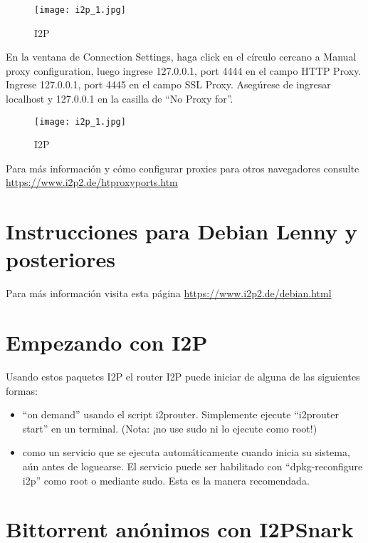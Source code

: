 \documentclass[10pt,a5paper,twoside,,]{book}
\providecommand{\tightlist}{%
  \setlength{\itemsep}{0pt}\setlength{\parskip}{0pt}}
\begin{document}
\begin{figure}[htbp]
\centering
\texttt{[image: i2p\_1.jpg]}
\caption{I2P}
\end{figure}

En la ventana de Connection Settings, haga click en el círculo cercano a
Manual proxy configuration, luego ingrese 127.0.0.1, port 4444 en el
campo HTTP Proxy. Ingrese 127.0.0.1, port 4445 en el campo SSL Proxy.
Asegúrese de ingresar localhost y 127.0.0.1 en la casilla de ``No Proxy
for''.

\begin{figure}[htbp]
\centering
\texttt{[image: i2p\_1.jpg]}
\caption{I2P}
\end{figure}

Para más información y cómo configurar proxies para otros navegadores
consulte \url{https://www.i2p2.de/htproxyports.htm}

\chapter{Instrucciones para Debian Lenny y
posteriores}\label{instrucciones-para-debian-lenny-y-posteriores}

Para más información visita esta página
\href{https://www.i2p2.de/debian-html}{https://www.i2p2.de/debian.html}

\chapter{Empezando con I2P}\label{empezando-con-i2p}

Usando estos paquetes I2P el router I2P puede iniciar de alguna de las
siguientes formas:

\begin{itemize}
\tightlist
\item
  ``on demand'' usando el script i2prouter. Simplemente ejecute
  ``i2prouter start'' en un terminal. (Nota: ¡no use sudo ni lo ejecute
  como root!)
\item
  como un servicio que se ejecuta automáticamente cuando inicia su
  sistema, aún antes de loguearse. El servicio puede ser habilitado con
  ``dpkg-reconfigure i2p'' como root o mediante sudo. Esta es la manera
  recomendada.
\end{itemize}

\chapter{Bittorrent anónimos con
I2PSnark}\label{bittorrent-anuxf3nimos-con-i2psnark}
\end{document}
